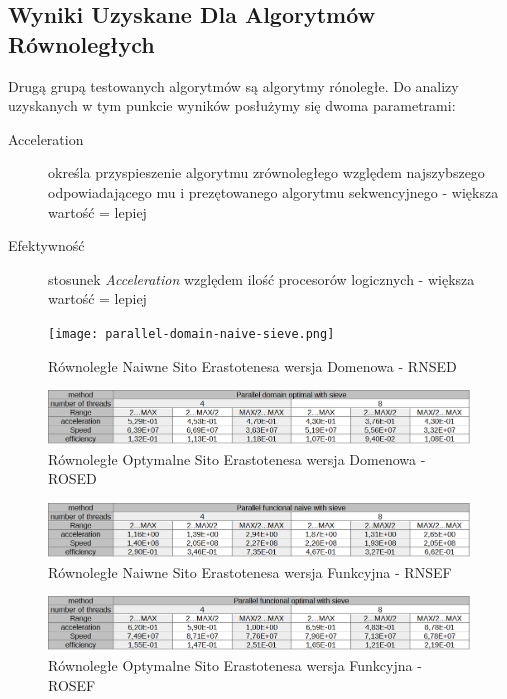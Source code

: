 \documentclass{article}
\begin{document}
        \subsection{Wyniki Uzyskane Dla Algorytmów Równoległych}
            Drugą grupą testowanych algorytmów są algorytmy rónoległe. Do analizy uzyskanych w tym punkcie wyników posłużymy się dwoma parametrami:
                \begin{description}
                    \item[Acceleration] określa przyspieszenie algorytmu zrównoległego względem najszybszego odpowiadającego mu i prezętowanego algorytmu sekwencyjnego - większa wartość = lepiej
                    \item[Efektywność] stosunek \emph{Acceleration} względem ilość procesorów logicznych - większa wartość = lepiej
                \end{description}
                \begin{figure}[H]
                    \caption{Równoległe Naiwne Sito Erastotenesa wersja Domenowa - \gls{RNSED}}
                    \texttt{[image: parallel-domain-naive-sieve.png]}
                \end{figure}
                \begin{figure}[H]
                    \caption{Równoległe Optymalne Sito Erastotenesa wersja Domenowa - \gls{ROSED}}
                    \includegraphics[width=13cm]{parallel-domain-optimal-sieve.png}
                \end{figure}
                \begin{figure}[H]
                    \caption{Równoległe Naiwne Sito Erastotenesa wersja Funkcyjna - \gls{RNSEF}}
                    \includegraphics[width=13cm]{parallel-functional-naive.png}
                \end{figure}
                \begin{figure}[H]
                    \caption{Równoległe Optymalne Sito Erastotenesa wersja Funkcyjna - \gls{ROSEF}}
                    \includegraphics[width=13cm]{paralel-functional-optimal.png}
                \end{figure}
\end{document}
